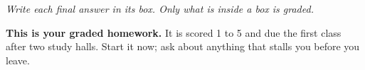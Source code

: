 \documentclass[12pt]{article}
\begin{document}
{\small\itshape Write each final answer in its box. Only what is inside a box is graded.}\par

\vspace{0.04in}

\boxguard[8]
\begin{remindbox}
\small
\textbf{This is your graded homework.} It is scored 1 to 5 and due the first class after two study
halls. Start it now; ask about anything that stalls you before you leave.
\end{remindbox}

\vspace{0.04in}
\end{document}
